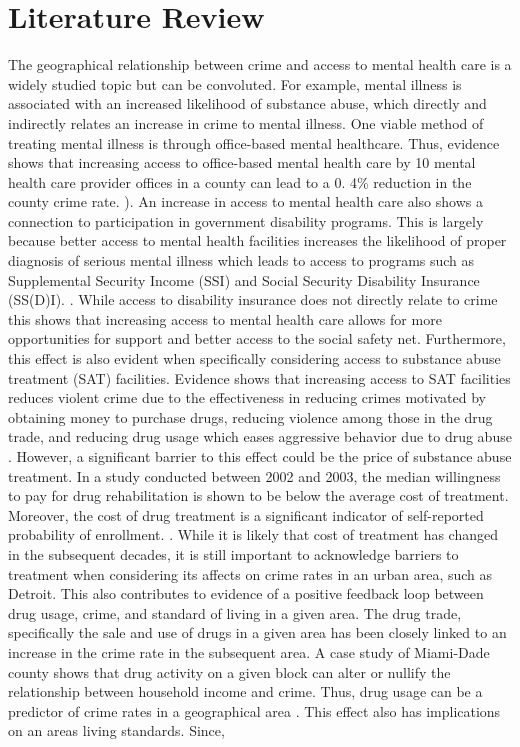 \documentclass[12pt]{article}
\begin{document}
\section{Literature Review} \label{sec:literature}
The geographical relationship between crime and access to mental health care is a widely studied topic but can be convoluted. For example, mental illness is associated with an increased likelihood of substance abuse, which directly and indirectly relates an increase in crime to mental illness. One viable method of treating mental illness is through office-based mental healthcare. Thus, evidence shows that increasing access to office-based mental health care by 10 mental health care provider offices in a county can lead to a 0. 4\% reduction in the county crime rate. \cite{mental_healthcare_and_crime}). An increase in access to mental health care also shows a connection to participation in government disability programs. This is largely because better access to mental health facilities increases the likelihood of proper diagnosis of serious mental illness which leads to access to programs such as Supplemental Security Income (SSI) and Social Security Disability Insurance (SS(D)I). \cite{mental_health_and_disability}. While access to disability insurance does not directly relate to crime this shows that increasing access to mental health care allows for more opportunities for support and better access to the social safety net. Furthermore, this effect is also evident when specifically considering access to substance abuse treatment (SAT) facilities. Evidence shows that increasing access to SAT facilities reduces violent crime due to the effectiveness in reducing crimes motivated by obtaining money to purchase drugs, reducing violence among those in the drug trade, and reducing drug usage which eases aggressive behavior due to drug abuse \cite{SAT_centers_and_crime}. However, a significant barrier to this effect could be the price of substance abuse treatment. In a study conducted between 2002 and 2003, the median willingness to pay for drug rehabilitation is shown to be below the average cost of treatment. Moreover, the cost of drug treatment is a significant indicator of self-reported probability of enrollment. \cite{cost_of_drug_treatment}. While it is likely that cost of treatment has changed in the subsequent decades, it is still important to acknowledge barriers to treatment when considering its affects on crime rates in an urban area, such as Detroit. This also contributes to evidence of a positive feedback loop between drug usage, crime, and standard of living in a given area. The drug trade, specifically the sale and use of drugs in a given area has been closely linked to an increase in the crime rate in the subsequent area. A case study of Miami-Dade county shows that drug activity on a given block can alter or nullify the relationship between household income and crime. Thus, drug usage can be a predictor of crime rates in a geographical area \cite{drugs_crime_space_time}. This effect also has implications on an areas living standards. Since,
\end{document}
